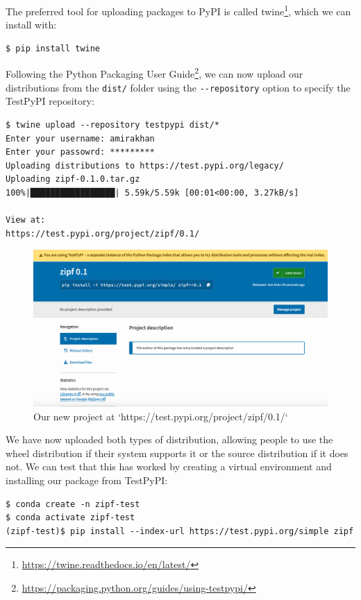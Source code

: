 \documentclass[
]{krantz}
\renewcommand{\href}[2]{#2\footnote{\url{#1}}}
\begin{document}
The preferred tool for uploading packages to PyPI is called \href{https://twine.readthedocs.io/en/latest/}{twine},
which we can install with:

\begin{verbatim}
$ pip install twine
\end{verbatim}

Following the \href{https://packaging.python.org/guides/using-testpypi/}{Python Packaging User Guide},
we can now upload our distributions from the \texttt{dist/} folder
using the \texttt{-\/-repository} option to specify the TestPyPI repository:

\begin{verbatim}
$ twine upload --repository testpypi dist/*
Enter your username: amirakhan
Enter your passowrd: *********
Uploading distributions to https://test.pypi.org/legacy/
Uploading zipf-0.1.0.tar.gz
100%|█████████████████| 5.59k/5.59k [00:01<00:00, 3.27kB/s]

View at:
https://test.pypi.org/project/zipf/0.1/
\end{verbatim}

\begin{figure}

{\centering \includegraphics[width=1\linewidth]{figures/packaging/testpypi} 

}

\caption{Our new project at `https://test.pypi.org/project/zipf/0.1/`}\label{fig:packaging-testpypi}
\end{figure}

We have now uploaded both types of distribution,
allowing people to use the wheel distribution if their system supports it
or the source distribution if it does not.
We can test that this has worked
by creating a virtual environment
and installing our package from TestPyPI:

\begin{verbatim}
$ conda create -n zipf-test
$ conda activate zipf-test
(zipf-test)$ pip install --index-url https://test.pypi.org/simple zipf
\end{verbatim}
\end{document}
